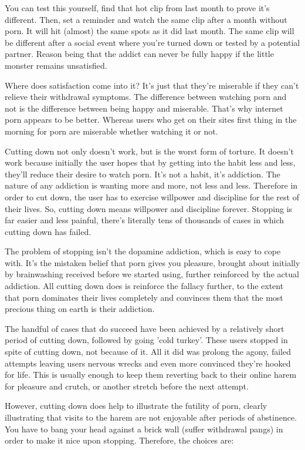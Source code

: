 \documentclass[
]{book}
\begin{document}
You can test this yourself, find that hot clip from last month to prove it's different. Then, set a reminder and watch the same clip after a month without porn. It will hit (almost) the same spots as it did last month. The same clip will be different after a social event where you're turned down or tested by a potential partner. Reason being that the addict can never be fully happy if the little monster remains unsatisfied.

Where does satisfaction come into it? It's just that they're miserable if they can't relieve their withdrawal symptoms. The difference between watching porn and not is the difference between being happy and miserable. That's why internet porn appears to be better. Whereas users who get on their sites first thing in the morning for porn are miserable whether watching it or not.

Cutting down not only doesn't work, but is the worst form of torture. It doesn't work because initially the user hopes that by getting into the habit less and less, they'll reduce their desire to watch porn. It's not a habit, it's addiction. The nature of any addiction is wanting more and more, not less and less. Therefore in order to cut down, the user has to exercise willpower and discipline for the rest of their lives. So, cutting down means willpower and discipline forever. Stopping is far easier and less painful, there's literally tens of thousands of cases in which cutting down has failed.

The problem of stopping isn't the dopamine addiction, which is easy to cope with. It's the mistaken belief that porn gives you pleasure, brought about initially by brainwashing received before we started using, further reinforced by the actual addiction. All cutting down does is reinforce the fallacy further, to the extent that porn dominates their lives completely and convinces them that the most precious thing on earth is their addiction.

The handful of cases that do succeed have been achieved by a relatively short period of cutting down, followed by going 'cold turkey'. These users stopped in spite of cutting down, not because of it. All it did was prolong the agony, failed attempts leaving users nervous wrecks and even more convinced they're hooked for life. This is usually enough to keep them reverting back to their online harem for pleasure and crutch, or another stretch before the next attempt.

However, cutting down does help to illustrate the futility of porn, clearly illustrating that visits to the harem are not enjoyable after periods of abstinence. You have to bang your head against a brick wall (suffer withdrawal pangs) in order to make it nice upon stopping. Therefore, the choices are:
\end{document}
